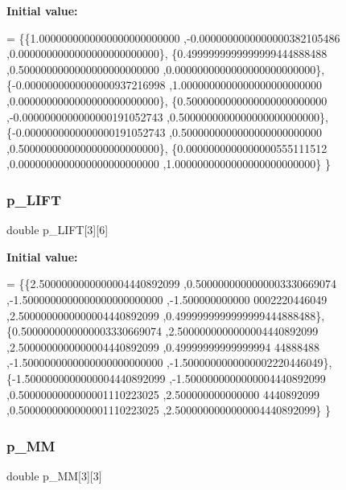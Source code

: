 {\bfseries Initial value\+:}
\begin{DoxyCode}
= \{\{1.0000000000000000000000000 ,-0.0000000000000000382105486 ,0.0000000000000000000000000\},
\{0.4999999999999999444888488 ,0.5000000000000000000000000 ,0.0000000000000000000000000\},
\{-0.0000000000000000937216998 ,1.0000000000000000000000000 ,0.0000000000000000000000000\},
\{0.5000000000000000000000000 ,-0.0000000000000000191052743 ,0.5000000000000000000000000\},
\{-0.0000000000000000191052743 ,0.5000000000000000000000000 ,0.5000000000000000000000000\},
\{0.0000000000000000555111512 ,0.0000000000000000000000000 ,1.0000000000000000000000000\}
\}
\end{DoxyCode}
\mbox{\label{a00446_a162ef160c01b03cd05791dc9a6acc934}} 
\subsubsection{\texorpdfstring{p\+\_\+\+L\+I\+FT}{p\_LIFT}}
{\footnotesize\ttfamily double p\+\_\+\+L\+I\+FT\mbox{[}3\mbox{]}\mbox{[}6\mbox{]}}

{\bfseries Initial value\+:}
\begin{DoxyCode}
= \{\{2.5000000000000004440892099 ,0.5000000000000003330669074 ,-1.5000000000000000000000000 ,-1.500000000000
      0002220446049 ,2.5000000000000004440892099 ,0.4999999999999999444888488\},
\{0.5000000000000003330669074 ,2.5000000000000004440892099 ,2.5000000000000004440892099 ,0.49999999999999994
      44888488 ,-1.5000000000000000000000000 ,-1.5000000000000002220446049\},
\{-1.5000000000000004440892099 ,-1.5000000000000004440892099 ,0.5000000000000001110223025 ,2.500000000000000
      4440892099 ,0.5000000000000001110223025 ,2.5000000000000004440892099\}
\}
\end{DoxyCode}
\mbox{\label{a00446_ac8ae9cb67334e33c4222bea485bf39fe}} 
\subsubsection{\texorpdfstring{p\+\_\+\+MM}{p\_MM}}
{\footnotesize\ttfamily double p\+\_\+\+MM\mbox{[}3\mbox{]}\mbox{[}3\mbox{]}}

